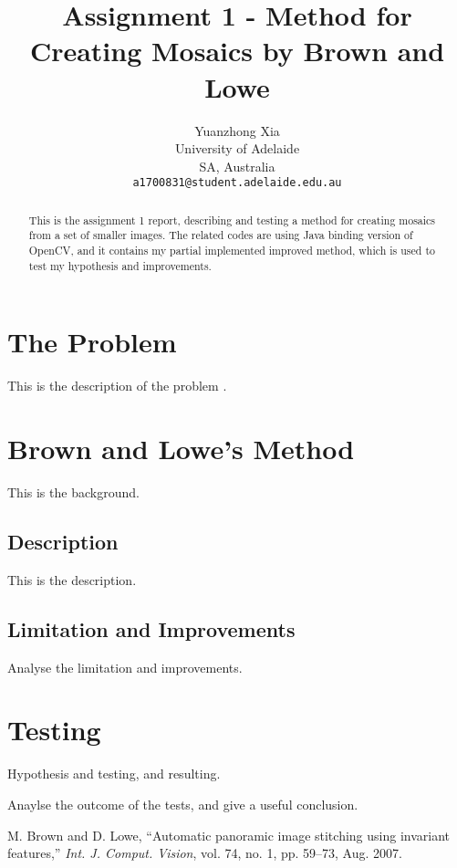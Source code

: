 \documentclass[10pt,twocolumn,letterpaper]{article}
\begin{document}
\title{Assignment 1 - Method for Creating Mosaics by Brown and Lowe}
\author{Yuanzhong Xia\\
University of Adelaide\\
SA, Australia\\
{\tt\small a1700831@student.adelaide.edu.au}
}
\maketitle

\begin{abstract}
This is the assignment 1 report, describing and testing a method for creating mosaics from a set of smaller images.
The related codes are using Java binding version of OpenCV, and it contains my partial implemented improved method, which is used to test my hypothesis and improvements.
\end{abstract}


\section{The Problem}
This is the description of the problem \cite{origin}.


\section{Brown and Lowe's Method}
This is the background.

\subsection{Description}
This is the description.

\subsection{Limitation and Improvements}
Analyse the limitation and improvements.


\section{Testing}
Hypothesis and testing, and resulting.

Anaylse the outcome of the tests, and give a useful conclusion.


\begin{thebibliography}{9}
M. Brown and D. Lowe, ``Automatic panoramic image stitching using invariant features,''
\textit{Int. J. Comput. Vision}, vol. 74, no. 1, pp. 59–73, Aug. 2007.

\end{thebibliography}
\end{document}
